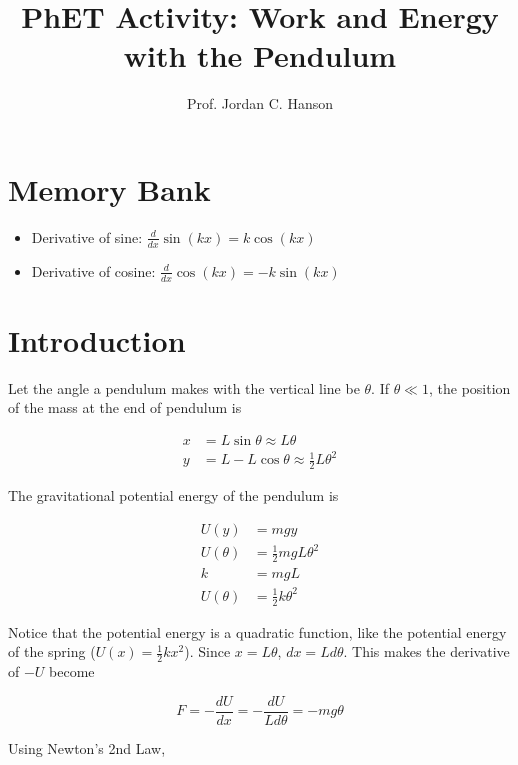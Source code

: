 \documentclass{article}
\begin{document}
\twocolumn
\small

\title{PhET Activity: Work and Energy with the Pendulum}
\author{Prof. Jordan C. Hanson}

\maketitle

\section{Memory Bank}

\begin{itemize}
\item Derivative of sine: $\frac{d}{dx} \sin(kx) = k\cos(kx)$
\item Derivative of cosine: $\frac{d}{dx} \cos(kx) = -k\sin(kx)$
\end{itemize}

\section{Introduction}

Let the angle a pendulum makes with the vertical line be $\theta$.  If $\theta \ll 1$, the position of the mass at the end of pendulum is

\begin{align}
x &= L\sin\theta \approx L\theta \\
y &= L-L\cos\theta \approx \frac{1}{2}L\theta^2
\end{align}

The gravitational potential energy of the pendulum is 

\begin{align}
U(y) &= mgy \\
U(\theta) &= \frac{1}{2}mgL\theta^2 \\
k &= mgL \\
U(\theta) &= \frac{1}{2}k\theta^2
\end{align}

Notice that the potential energy is a quadratic function, like the potential energy of the spring ($U(x) = \frac{1}{2} k x^2$).  Since $x = L\theta$, $dx = Ld\theta$.  This makes the derivative of $-U$ become

\begin{equation}
F = -\frac{dU}{dx} = -\frac{dU}{Ld\theta} = -mg\theta
\end{equation}

Using Newton's 2nd Law,
\end{document}
